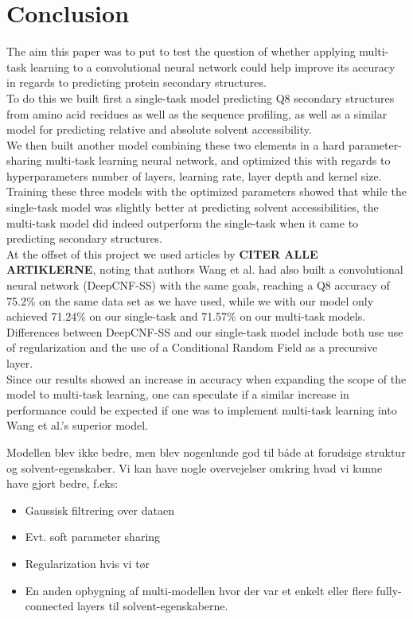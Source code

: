 \section{Conclusion}
The aim this paper was to put to test the question of whether applying multi-task learning to a convolutional neural network could help improve its accuracy in regards to predicting protein secondary structures.\\
To do this we built first a single-task model predicting Q8 secondary structures from amino acid recidues as well as the sequence profiling, as well as a similar model for predicting relative and absolute solvent accessibility.\\
We then built another model combining these two elements in a hard parameter-sharing multi-task learning neural network, and optimized this with regards to hyperparameters number of layers, learning rate, layer depth and kernel size.\\
Training these three models with the optimized parameters showed that while the single-task model was slightly better at predicting solvent accessibilities, the multi-task model did indeed outperform the single-task when it came to predicting secondary structures.\\
At the offset of this project we used articles by \textbf{CITER ALLE ARTIKLERNE}, noting that authors Wang et al. had also built a convolutional neural network (DeepCNF-SS) with the same goals, reaching a Q8 accuracy of 75.2\% on the same data set as we have used, while we with our model only achieved 71.24\% on our single-task and 71.57\% on our multi-task models. Differences between DeepCNF-SS and our single-task model include both use use of regularization and the use of a Conditional Random Field as a precursive layer. \\
Since our results showed an increase in accuracy when expanding the scope of the model to multi-task learning, one can speculate if a similar increase in performance could be expected if one was to implement multi-task learning into Wang et al.'s superior model.

Modellen blev ikke bedre, men blev nogenlunde god til både at forudsige struktur og solvent-egenskaber.
Vi kan have nogle overvejelser omkring hvad vi kunne have gjort bedre, f.eks:
\begin{itemize}
\item Gaussisk filtrering over dataen
\item Evt. soft parameter sharing
\item Regularization hvis vi tør
\item En anden opbygning af multi-modellen hvor der var et enkelt eller flere fully-connected layers til solvent-egenskaberne.
\end{itemize}

